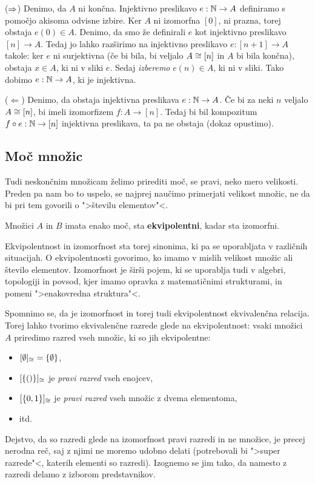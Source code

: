 \begin{dokaz}

($\Rightarrow$)
%
Denimo, da $A$ ni končna.
Injektivno preslikavo $e : \mathbb{N} \to A$ definiramo s pomočjo akisoma odvisne izbire.
Ker $A$ ni izomorfna $[0]$, ni prazna, torej obstaja $e(0) \in A$.
Denimo, da smo že definirali $e$ kot injektivno preslikavo $[n] \to A$.
Tedaj jo lahko razširimo na injektivno preslikavo $e : [n+1] \to A$ takole: ker $e$ ni surjektivna (če bi bila, bi veljalo $A \cong [n]$ in $A$ bi bila končna), obstaja $x \in A$, ki ni v sliki $e$.
Sedaj \emph{izberemo} $e(n) \in A$, ki ni v sliki.
Tako dobimo $e : \mathbb{N} \to A$, ki je injektivna.

($\Leftarrow$)
%
Denimo, da obstaja injektivna preslikava $e : \mathbb{N} \to A$.
Če bi za neki $n$ veljalo $A \cong [n]$, bi imeli izomorfizem $f : A \to [n]$.
Tedaj bi bil kompozitum $f \circ e : \mathbb{N} \to [n]$ injektivna preslikava, ta pa ne obstaja (dokaz opustimo).
\end{dokaz}

\subsection{Moč množic}

Tudi neskončnim množicam želimo prirediti moč, se pravi, neko mero velikosti. Preden pa nam bo to uspelo, se najprej naučimo primerjati velikost množic, ne da bi pri tem govorili o ">številu elementov"<.

\begin{definicija}
  Množici $A$ in $B$ imata enako moč, sta \textbf{ekvipolentni}, kadar sta izomorfni.
\end{definicija}

Ekvipolentnost in izomorfnost sta torej sinonima, ki pa se uporabljata v različnih situacijah. O ekvipolentnosti govorimo, ko imamo v mislih velikost množic ali število elementov. Izomorfnost je širši pojem, ki se uporablja tudi v algebri, topologiji in povsod, kjer imamo opravka z matematičnimi strukturami, in pomeni ">enakovredna struktura"<.

Spomnimo se, da je izomorfnost in torej tudi ekvipolentnost ekvivalenčna relacija.
Torej lahko tvorimo ekvivalenčne razrede glede na ekvipolentnost: vsaki množici $A$ priredimo razred vseh množic, ki so jih ekvipolentne:
%
\begin{itemize}
\item $[\emptyset]_{\cong} = \{ \emptyset \}$,
\item $[\left\{ () \right\}]_{\cong}$ je \emph{pravi razred} vseh enojcev,
\item $[\left\{0, 1\right\}]_{\cong}$ je \emph{pravi razred} vseh množic z dvema elementoma,
\item itd.
\end{itemize}
%
Dejstvo, da so razredi glede na izomorfnost pravi razredi in ne množice, je precej nerodna reč, saj z njimi ne moremo udobno delati (potrebovali bi ">super razrede"<, katerih elementi so razredi).
Izognemo se jim tako, da namesto z razredi delamo z izborom predstavnikov.

